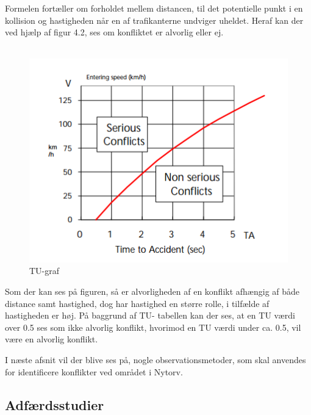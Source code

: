 Formelen fortæller om forholdet mellem distancen, til det potentielle punkt i en kollision og hastigheden når en af trafikanterne undviger uheldet. Heraf kan der ved hjælp af figur 4.2, ses om konfliktet er alvorlig eller ej.
~\\\\

\begin{figure}[htbp]
  \label{fig:tugraf}
  \centering
  \begin{adjustbox}{max width=\textwidth}
    \includegraphics[scale=0.6]{billederogfigur/tugraf.png} %
 \end{adjustbox}
  \caption{TU-graf}
\end{figure}

Som der kan ses på figuren, så er alvorligheden af en konflikt afhængig af både distance samt hastighed, dog har hastighed en større rolle, i tilfælde af hastigheden er høj.
På baggrund af TU- tabellen kan der ses, at en TU værdi over 0.5 ses som ikke alvorlig konflikt, hvorimod en TU værdi under ca. 0.5, vil være en alvorlig konflikt.

I næste afsnit vil der blive ses på, nogle observationsmetoder, som skal anvendes for identificere konflikter ved området i Nytorv.
~\\
\subsection{Adfærdsstudier}
\label{sub:adfaerdsstudie}

